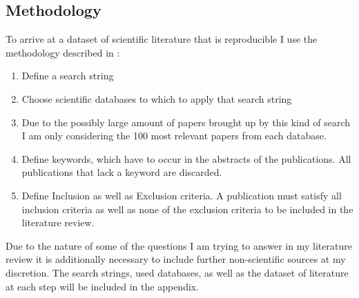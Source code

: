 \documentclass[
	11pt,								%
	DIV10,								%
	a4paper,         					%
	oneside,							%
	headheight=20pt,					%
	footheight=20pt,					%
    parskip=full,						%
    listof=totoc,						%
	bibliography=totoc,					%
	index=totoc,						%
]{scrartcl}
\begin{document}
\subsection{Methodology}
To arrive at a dataset of scientific literature that is reproducible I use the methodology described in :

\begin{enumerate}
	\item Define a search string
	\item Choose scientific databases to which to apply that search string
	\item Due to the possibly large amount of papers brought up by this kind of search I am only considering the 100 most relevant papers from each database.
	\item Define keywords, which have to occur in the abstracts of the publications. All publications that lack a keyword are discarded.
	\item Define Inclusion as well as Exclusion criteria. A publication must satisfy all inclusion criteria as well as none of the exclusion criteria to be included in the literature review.
\end{enumerate}
Due to the nature of some of the questions I am trying to answer in my literature review it is additionally necessary to include further non-scientific sources at my discretion.
The search strings, used databases, as well as the dataset of literature at each step will be included in the appendix. 
\end{document}
